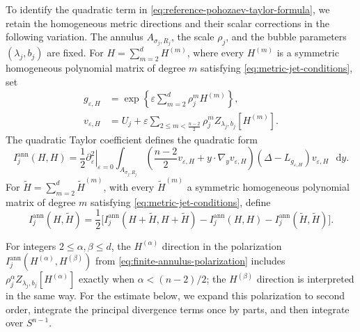 \documentclass[11pt]{article}
\numberwithin{equation}{section}
\theoremstyle{remark}
\newcommand{\Sph}{S}
\newcommand{\eps}{\varepsilon}
\newcommand{\dd}{\mathop{}\!\mathrm{d}}
\begin{document}
To identify the quadratic term in
\eqref{eq:reference-pohozaev-taylor-formula}, we retain the homogeneous metric
directions and their scalar corrections in the following variation. The
annulus \(A_{\sigma_j,R_j}\), the scale \(\rho_j\),
and the bubble parameters \((\lambda_j,b_j)\) are fixed. For
\(H=\sum_{m=2}^{d}H^{(m)}\), where every
\(H^{(m)}\) is a symmetric homogeneous polynomial matrix of degree \(m\)
satisfying \eqref{eq:metric-jet-conditions}, set
\begin{equation}\label{eq:finite-annulus-quadratic-path}
 \begin{aligned}
 g_{\eps,H}
 &=\exp\left\{\eps
 \sum_{m=2}^{d}\rho_j^mH^{(m)}\right\},\\
 v_{\eps,H}
 &=U_j
 +\eps\sum_{2\le m<\frac{n-2}{2}}\rho_j^m
 Z_{\lambda_j,b_j}[H^{(m)}].
 \end{aligned}
\end{equation}
The quadratic Taylor coefficient defines the quadratic form
\begin{equation}\label{eq:finite-annulus-quadratic-form}
 I_j^{\mathrm{ann}}(H,H)=\frac12
 \left.\partial_\eps^2\right|_{\eps=0}
 \int_{A_{\sigma_j,R_j}}
 \left(\frac{n-2}{2}v_{\eps,H}
 +y\cdot\nabla_yv_{\eps,H}\right)
 (\Delta-L_{g_{\eps,H}})v_{\eps,H}\,\dd y.
\end{equation}
For
\(\widetilde H=\sum_{m=2}^{d}\widetilde H^{(m)}\), with every
\(\widetilde H^{(m)}\) a symmetric homogeneous polynomial matrix of degree \(m\)
satisfying \eqref{eq:metric-jet-conditions}, define
\begin{equation}\label{eq:finite-annulus-polarization}
 I_j^{\mathrm{ann}}(H,\widetilde H)=\frac12\bigl[
 I_j^{\mathrm{ann}}(H+\widetilde H,H+\widetilde H)
 -I_j^{\mathrm{ann}}(H,H)-I_j^{\mathrm{ann}}(\widetilde H,\widetilde H)
 \bigr].
\end{equation}

For integers
\(2\le\alpha,\beta\le d\), the
\(H^{(\alpha)}\) direction in the polarization
\(I_j^{\mathrm{ann}}(H^{(\alpha)},H^{(\beta)})\) from
\eqref{eq:finite-annulus-polarization} includes
\(\rho_j^\alpha Z_{\lambda_j,b_j}[H^{(\alpha)}]\) exactly when
\(\alpha<(n-2)/2\); the \(H^{(\beta)}\) direction is interpreted in the
same way. For the estimate below, we expand this polarization to second
order, integrate the principal divergence terms once by parts, and then
integrate over \(\Sph^{n-1}\).
\end{document}
